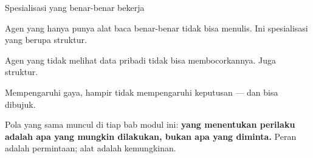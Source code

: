 \documentclass[aspectratio=169,11pt,t]{beamer}
\begin{document}
\begin{frame}[shrink=25]{Spesialisasi yang benar-benar bekerja}
\begin{minipage}[t]{0.3253\textwidth}
\begin{icardgood}
Agen yang hanya punya alat baca benar-benar tidak bisa menulis. Ini spesialisasi yang berupa struktur.
\end{icardgood}
\end{minipage}%
\hfill
\begin{minipage}[t]{0.3253\textwidth}
\begin{icardgood}
Agen yang tidak melihat data pribadi tidak bisa membocorkannya. Juga struktur.
\end{icardgood}
\end{minipage}%
\hfill
\begin{minipage}[t]{0.3253\textwidth}
\begin{icardbad}
Mempengaruhi gaya, hampir tidak mempengaruhi keputusan --- dan bisa dibujuk.
\end{icardbad}
\end{minipage}%
{\fontsize{9.4}{12.6}\selectfont\color{fg2}Pola yang sama muncul di tiap bab modul ini: \textbf{yang menentukan perilaku adalah apa yang mungkin dilakukan, bukan apa yang diminta.} Peran adalah permintaan; alat adalah kemungkinan.\par}\vskip 4pt
\end{frame}
\end{document}
